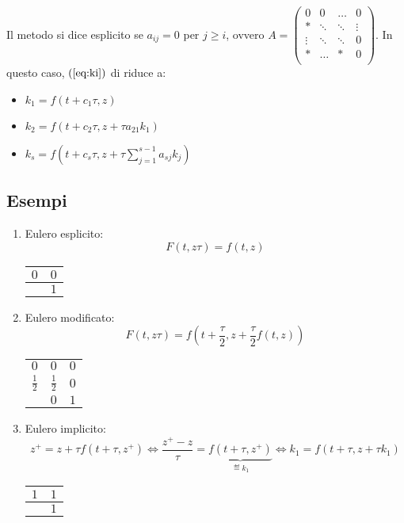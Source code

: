 \documentclass[hidelinks, 10pt]{report}
\begin{document}
Il metodo si dice esplicito se $ a_{ij} = 0 $ per $ j \ge i $, ovvero $ A = \begin{pmatrix}
	     0 &      0 & \ldots &      0 \\
	  \ast & \ddots & \ddots & \vdots \\
	\vdots & \ddots & \ddots &      0 \\
	  \ast & \ldots &   \ast &      0 \\
\end{pmatrix} $. In questo caso, $ (\ref{eq:ki}) $ di riduce a:
\begin{itemize}
\item $ k_{1} = f(t + c_{1} \tau, z) $
\item $ k_{2} = f(t + c_{2} \tau, z + \tau a_{21} k_{1}) $
\item $ k_{s} = f \left( t + c_{s} \tau, z + \tau \sum\limits_{j = 1}^{s-1} a_{sj} k_{j} \right) $
\end{itemize}

\subsection{Esempi}
\begin{enumerate}
\item Eulero esplicito:
\[ F(t, z \tau) = f(t, z) \]

\begin{center}
\begin{tabular}{c|c}
$ 0 $ & $ 0 $ \\
\hline
	  & $ 1 $ \\
\end{tabular}
\end{center}
\item Eulero modificato: 
\[ F(t, z \tau) = f \left( t + \frac{\tau}{2}, z + \frac{\tau}{2} f(t, z) \right) \]

\begin{center}
\begin{tabular}{c|cc}
          $ 0 $ &           $ 0 $ & $ 0 $ \\
$ \frac{1}{2} $ & $ \frac{1}{2} $ & $ 0 $ \\
\hline
                &           $ 0 $ & $ 1 $ \\

\end{tabular}
\end{center}
\item Eulero implicito:
\[ z^{+} = z + \tau f(t + \tau, z^{+}) \iff \frac{z^{+} - z}{\tau} = \underbrace{f(t + \tau, z^{+})}_{\eqdef k_{1}} \iff k_{1} = f(t + \tau, z + \tau k_{1}) \]

\begin{center}
\begin{tabular}{c|c}
$ 1 $ & $ 1 $ \\
\hline
	  & $ 1 $ \\
\end{tabular}
\end{center}
\end{enumerate}
\end{document}
